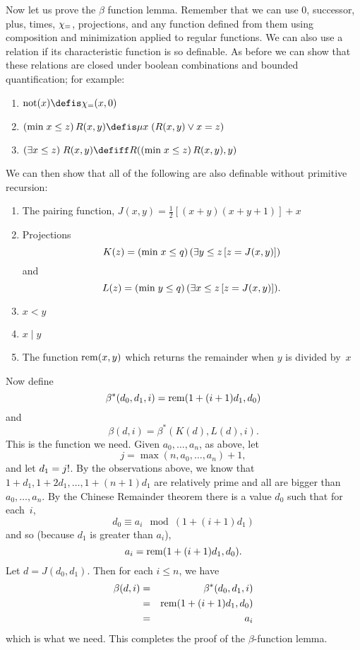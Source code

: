 \documentclass[../../../include/open-logic-section]{subfiles}
\begin{document}
Now let us prove the $\beta$ function lemma. Remember that we can use
$0$, successor, plus, times, $\chi_{=}$, projections, and any function
defined from them using composition and minimization applied to
regular functions. We can also use a relation if its characteristic
function is so definable. As before we can show that these relations
are closed under boolean combinations and bounded quantification; for
example:
\begin{enumerate}
\item $\fn{not}(x) \defis \Char{=}(x,0)$
\item $\bmin{x \leq z}{R(x,y)} \defis \umin{x}{(R(x,y) \lor x = z)}$
\item $\bexists{x \leq z}{R(x,y)} \defiff R(\bmin{x \leq z}{R(x,y)}, y)$
\end{enumerate}
We can then show that all of the following are also definable without
primitive recursion:
\begin{enumerate}
\item The pairing function, $J(x,y) = \frac{1}{2}[(x+y)(x+y+1)] + x$
\item Projections
\[
K(z) = \bmin{x \leq q}{(\lexists[y \leq z] \, [z = J(x,y)])}
\]
and
\[
L(z) = \bmin{y \leq q}{(\lexists[x \leq z]\, [z = J(x,y)])}.
\]
\item $x < y$
\item $x \mid y$
\item The function $\mathrm{rem}(x,y)$ which returns the remainder when
  $y$ is divided by~$x$
\end{enumerate}
Now define
\[
\beta^*(d_0,d_1,i) = \mathrm{rem}(1+(i+1) d_1,d_0)
\]
and
\[
\beta(d,i) = \beta^*(K(d),L(d),i).
\]
This is the function we need. Given $a_0,\dots,a_n$, as above, let
\[
j = \max(n,a_0,\dots,a_n)+1,
\]
and let $d_1 = j\text{!}$. By the observations above, we know that $1+d_1,
1+2 d_1, \dots, 1+(n+1) d_1$ are relatively prime and all are bigger
than $a_0,\dots,a_n$. By the Chinese Remainder theorem there is a
value $d_0$ such that for each~$i$,
\[
d_0 \equiv a_i \mod (1+(i+1)d_1)
\]
and so (because $d_1$ is greater than $a_i$),
\[
a_i = \mathrm{rem}(1+(i+1)d_1,d_0).
\]
Let $d = J(d_0,d_1)$. Then for each $i \le n$, we have
\begin{eqnarray*}
\beta(d,i) & = & \beta^*(d_0,d_1,i) \\
& = & \fn{rem}(1+(i+1) d_1,d_0) \\
& = & a_i
\end{eqnarray*}
which is what we need. This completes the proof of the
$\beta$-function lemma.
\end{document}
